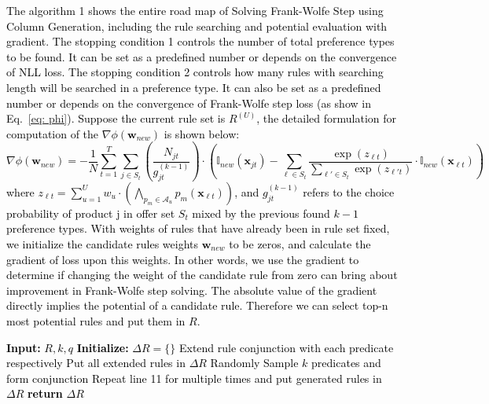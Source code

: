\documentclass{article} %
\begin{document}
\textcolor{black}{The algorithm 1 shows the entire road map of Solving Frank-Wolfe Step using Column Generation, including the rule searching and potential evaluation with gradient. The stopping condition 1 controls the number of total preference types to be found. It can be set as a predefined number or depends on the convergence of NLL loss. The stopping condition 2 controls how many rules with searching length will be searched in a preference type. It can also be set as a predefined number or depends on the convergence of Frank-Wolfe step loss (as show in Eq.~\ref{eq: phi}). Suppose the current rule set is $R^{(U)}$, the detailed formulation for computation of the $\nabla \phi(\boldsymbol{w}_{new})$ is shown below:
\[
   \nabla \phi(\boldsymbol{w}_{new}) = -\frac{1}{N} \sum_{t=1}^T \sum_{j \in S_t} \left( \frac{N_{jt}}{g_{jt}^{(k-1)}} \right) \cdot \left( \mathbb{I}_{new}(\boldsymbol{x}_{jt}) - \sum_{\ell \in S_t} \frac{\exp\left( z_{\ell t} \right)}{\sum_{\ell' \in S_t} \exp\left( z_{\ell' t} \right)} \cdot \mathbb{I}_{new}(\boldsymbol{x}_{\ell t}) \right)
   \]
      where \( z_{\ell t} = \sum_{u=1}^U w_u \cdot \left( \bigwedge_{p_m \in \mathcal{A}_u} p_m\left( \boldsymbol{x}_{\ell t} \right) \right) \), and $g_{jt}^{(k-1)}$ refers to the choice probability of product j in offer set $S_t$ mixed by the previous found $k-1$ preference types.
   With weights of rules that have already been in rule set fixed, we initialize the candidate rules weights $\boldsymbol{w}_{new}$ to be zeros, and calculate the gradient of loss upon this weights. In other words, we use the gradient to determine if changing the weight of the candidate rule from zero can bring about improvement in Frank-Wolfe step solving. The absolute value of the gradient directly implies the potential of a candidate rule. Therefore we can select top-n most potential rules and put them in $R$. 
}



\begin{algorithm}
\caption{\textcolor{black}{Generate Candidate Rules}}\label{euclid}
\begin{algorithmic}[1]
\State \textcolor{black}{\textbf{Input:}} \textcolor{black}{$R, k, q$}
\State \textcolor{black}{\textbf{Initialize:}} \textcolor{black}{$\Delta R=\{\}$}
\If{\textcolor{black}{$q = 0$}}
    \For {\textcolor{black}{$rule \in R$}}
        \If{\textcolor{black}{$rule\ conjunction\ length = k-1$}}
            \State \textcolor{black}{Extend rule conjunction with each predicate respectively} \Comment{\textcolor{black}{DFS}}
            \State \textcolor{black}{Put all extended rules in $\Delta R$}
        \EndIf
    \EndFor
\Else
    \State \textcolor{black}{Randomly Sample} \textcolor{black}{$k$} \textcolor{black}{predicates and form conjunction}
    \State \textcolor{black}{Repeat line 11 for multiple times and put generated rules in $\Delta R$}
\EndIf
\State \textcolor{black}{\textbf{return}} \textcolor{black}{$\Delta R$}
\end{algorithmic}
\end{algorithm}
\end{document}
